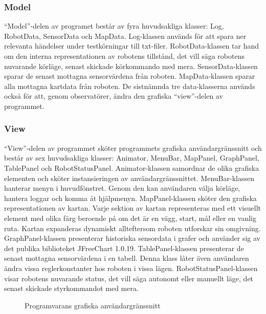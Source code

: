 \documentclass[11pt]{article}
\begin{document}
\begin{flushleft}
\subsubsection{Model}
``Model''-delen av programet består av fyra huvudsakliga klasser: Log, RobotData, SensorData och MapData. 
Log-klassen används för att spara ner relevanta händelser under testkörningar till txt-filer. 
RobotData-klassen tar hand om den interna representationen av robotens tillstånd, det vill säga robotens nuvarande körläge, senast skickade körkommando med mera. 
SensorData-klassen sparar de senast mottagna sensorvärdena från roboten. 
MapData-klassen sparar alla mottagna kartdata från roboten. De sistnämnda tre data-klasserna används också för att, genom observatörer, ändra den grafiska ``view''-delen av programmet.

\subsubsection{View}
``View''-delen av programmet sköter programmets grafiska användargränssnitt och består av sex huvudsakliga klasser: Animator, MenuBar, MapPanel, GraphPanel, TablePanel och RobotStatusPanel. Animator-klassen samordnar de olika grafiska elementen och sköter instansieringen av användargränssnittet. 
MenuBar-klassen hanterar menyn i huvudfönstret. Genom den kan användaren välja körläge, hantera loggar och komma åt hjälpmenyn. 
MapPanel-klassen sköter den grafiska representationen av kartan. Varje sektion av kartan representeras med ett visuellt element med olika färg beroende på om det är en vägg, start, mål eller en vanlig ruta. Kartan expanderas dynamiskt allteftersom roboten utforskar sin omgivning. 
GraphPanel-klassen presenterar historiska sensordata i grafer och använder sig av det publika biblioteket JFreeChart 1.0.19. 
TablePanel-klassen presenterar de senast mottagna sensorvärdena i en tabell. Denna klass låter även användaren ändra vissa reglerkonstanter hos roboten i vissa lägen.
RobotStatusPanel-klassen visar robotens nuvarande status, det vill säga autonomt eller manuellt läge, det senast skickade styrkommandot med mera.

\begin{figure}[H]
\centering
\noindent{}
	\caption{Programvarans grafiska användargränssnitt\label{software}}	
\end{figure}


\end{flushleft}
\end{document}
